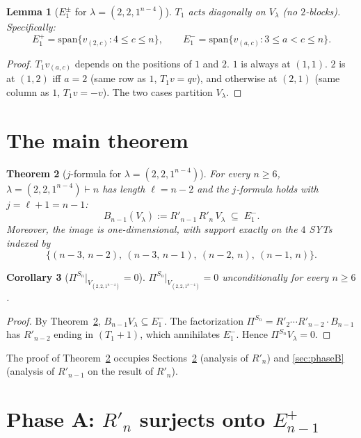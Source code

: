 \documentclass[11pt]{article}
\newtheorem{theorem}{Theorem}
\newtheorem{lemma}[theorem]{Lemma}
\newtheorem{corollary}[theorem]{Corollary}
\theoremstyle{definition}
\begin{document}
\begin{lemma}[$E_1^\pm$ for $\lambda=(2,2,1^{n-4})$]\label{lem:E1-22}
$T_1$ acts diagonally on $V_\lambda$ (no $2$-blocks).  Specifically:
\[
   E_1^+ = \mathrm{span}\{v_{(2,c)} : 4 \le c \le n\},
   \qquad
   E_1^- = \mathrm{span}\{v_{(a,c)} : 3 \le a < c \le n\}.
\]
\end{lemma}

\begin{proof}
$T_1v_{(a,c)}$ depends on the positions of $1$ and $2$.  $1$ is always
at $(1,1)$.  $2$ is at $(1,2)$ iff $a = 2$ (same row as $1$,
$T_1v=qv$), and otherwise at $(2,1)$ (same column as $1$, $T_1v=-v$).
The two cases partition $V_\lambda$.
\end{proof}

\section{The main theorem}

\begin{theorem}[$j$-formula for $\lambda=(2,2,1^{n-4})$]\label{thm:main}
For every $n \ge 6$, $\lambda = (2,2,1^{n-4}) \vdash n$ has length
$\ell = n-2$ and the $j$-formula holds with $j = \ell + 1 = n-1$:
\[
   B_{n-1}(V_\lambda) := R'_{n-1}\,R'_n\,V_\lambda \;\subseteq\; E_1^-.
\]
Moreover, the image is one-dimensional, with support exactly on the
$4$ SYTs indexed by
\[
   \bigl\{(n{-}3,\,n{-}2),\ (n{-}3,\,n{-}1),\ (n{-}2,\,n),\ (n{-}1,\,n)\bigr\}.
\]
\end{theorem}

\begin{corollary}[$\Pi^{S_n}|_{V_{(2,2,1^{n-4})}} = 0$]\label{cor:rank-zero}
$\Pi^{S_n}|_{V_{(2,2,1^{n-4})}} = 0$ unconditionally for every
$n \ge 6$.
\end{corollary}

\begin{proof}
By Theorem~\ref{thm:main}, $B_{n-1}V_\lambda \subseteq E_1^-$.  The
factorization $\Pi^{S_n} = R'_2 \cdots R'_{n-2} \cdot B_{n-1}$ has
$R'_{n-2}$ ending in $(T_1{+}1)$, which annihilates $E_1^-$.  Hence
$\Pi^{S_n} V_\lambda = 0$.
\end{proof}

The proof of Theorem~\ref{thm:main} occupies
Sections~\ref{sec:phaseA} (analysis of $R'_n$) and \ref{sec:phaseB}
(analysis of $R'_{n-1}$ on the result of $R'_n$).

\section{Phase A: $R'_n$ surjects onto $E_{n-1}^+$}\label{sec:phaseA}
\end{document}
